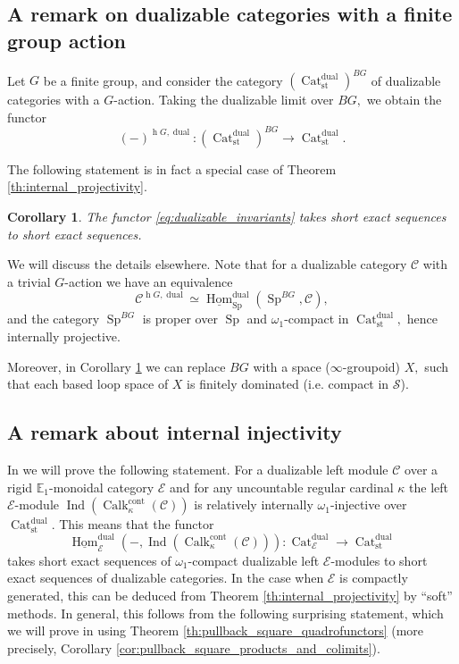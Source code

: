 \documentclass[11pt,leqno]{amsart}
\newtheorem{cor}[theo]{Corollary}
\numberwithin{equation}{section}
\def\h{\operatorname{h}}
\def\Hom{\operatorname{Hom}}
\newcommand{\Cat}{\operatorname{Cat}}
\newcommand{\cont}{\operatorname{cont}}
\newcommand{\st}{\operatorname{st}}
\newcommand{\dual}{\operatorname{dual}}
\newcommand{\bE}{{\mathbb E}}
\newcommand{\cC}{{\mathcal C}}
\newcommand{\cE}{{\mathcal E}}
\newcommand{\cS}{{\mathcal S}}
\newcommand{\un}{\underline}
\newcommand{\Sp}{\operatorname{Sp}}
\newcommand{\Ind}{\operatorname{Ind}}
\newcommand{\Calk}{\operatorname{Calk}}
\begin{document}
\subsection{A remark on dualizable categories with a finite group action}

Let $G$ be a finite group, and consider the category $(\Cat_{\st}^{\dual})^{BG}$ of dualizable categories with a $G$-action. Taking the dualizable limit over $BG,$ we obtain the functor
\begin{equation}\label{eq:dualizable_invariants}
(-)^{\h G,\dual}:(\Cat_{\st}^{\dual})^{BG}\to \Cat_{\st}^{\dual}.
\end{equation} 

The following statement is in fact a special case of Theorem \ref{th:internal_projectivity}.

\begin{cor}\label{cor:dualizable_invariants}
The functor \eqref{eq:dualizable_invariants} takes short exact sequences to short exact sequences.
\end{cor}

We will discuss the details elsewhere. Note that for a dualizable category $\cC$ with a trivial $G$-action we have an equivalence
\begin{equation*}
\cC^{\h G,\dual}\simeq \un{\Hom}_{\Sp}^{\dual}(\Sp^{BG},\cC),
\end{equation*} 
and the category $\Sp^{BG}$ is proper over $\Sp$ and $\omega_1$-compact in $\Cat_{\st}^{\dual},$ hence internally projective.

Moreover, in Corollary \ref{cor:dualizable_invariants} we can replace $BG$ with a space ($\infty$-groupoid) $X,$ such that each based loop space of $X$ is finitely dominated (i.e. compact in $\cS$). 

\subsection{A remark about internal injectivity} In \cite{E} we will prove the following statement. For a dualizable left module $\cC$ over a rigid $\bE_1$-monoidal category $\cE$ and for any uncountable regular cardinal $\kappa$ the left $\cE$-module $\Ind(\Calk_{\kappa}^{\cont}(\cC))$ is relatively internally $\omega_1$-injective over $\Cat_{\st}^{\dual}.$ This means that the functor
\begin{equation*}
\un{\Hom}_{\cE}^{\dual}(-,\Ind(\Calk_{\kappa}^{\cont}(\cC))):\Cat_{\cE}^{\dual}\to\Cat_{\st}^{\dual}
\end{equation*}
takes short exact sequences of $\omega_1$-compact dualizable left $\cE$-modules to short exact sequences of dualizable categories. In the case when $\cE$ is compactly generated, this can be deduced from Theorem \ref{th:internal_projectivity} by ``soft'' methods. In general, this follows from the following surprising statement, which we will prove in \cite{E} using Theorem \ref{th:pullback_square_quadrofunctors} (more precisely, Corollary \ref{cor:pullback_square_products_and_colimits}).
\end{document}
